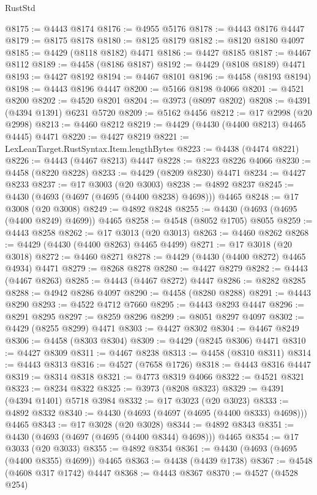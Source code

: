 \begin{lexlean}{RustStd}
\begin{coremodule}
@8175 := @4443 @8174
@8176 := @4955 @5176
@8178 := @4443 @8176 @4447
@8179 := @8175 @8178
@8180 := @8125 @8179
@8182 := @8120 @8180 @4097
@8185 := @4429 (@8118 @8182) @4471
@8186 := @4427 @8185
@8187 := @4467 @8112
@8189 := @4458 (@8186 @8187)
@8192 := @4429 (@8108 @8189) @4471
@8193 := @4427 @8192
@8194 := @4467 @8101
@8196 := @4458 (@8193 @8194)
@8198 := @4443 @8196 @4447
@8200 := @5166 @8198 @4066
@8201 := @4521 @8200
@8202 := @4520 @8201
@8204 := @3973 (@8097 @8202)
@8208 := @4391 (@4394 @1391) @6231 @5720
@8209 := @5162 @4456
@8212 := @17 @2998 (@20 @2998)
@8213 := @4460 @8212
@8219 := @4429 (@4430 (@4400 @8213) @4465 @4445) @4471
@8220 := @4427 @8219
@8221 := LexLeanTarget.RustSyntax.Item.lengthBytes
@8223 := @4438 (@4474 @8221)
@8226 := @4443 (@4467 @8213) @4447
@8228 := @8223 @8226 @4066
@8230 := @4458 (@8220 @8228)
@8233 := @4429 (@8209 @8230) @4471
@8234 := @4427 @8233
@8237 := @17 @3003 (@20 @3003)
@8238 := @4892 @8237
@8245 := @4430 (@4693 (@4697 (@4695 (@4400 @8238) @4698))) @4465
@8248 := @17 @3008 (@20 @3008)
@8249 := @4892 @8248
@8255 := @4430 (@4693 (@4695 (@4400 @8249) @4699)) @4465
@8258 := @4548 (@8052 @1705) @8055
@8259 := @4443 @8258
@8262 := @17 @3013 (@20 @3013)
@8263 := @4460 @8262
@8268 := @4429 (@4430 (@4400 @8263) @4465 @4499)
@8271 := @17 @3018 (@20 @3018)
@8272 := @4460 @8271
@8278 := @4429 (@4430 (@4400 @8272) @4465 @4934) @4471
@8279 := @8268 @8278
@8280 := @4427 @8279
@8282 := @4443 (@4467 @8263)
@8285 := @4443 (@4467 @8272) @4447
@8286 := @8282 @8285
@8288 := @4942 @8286 @4097
@8290 := @4458 (@8280 @8288)
@8291 := @4443 @8290
@8293 := @4522 @4712 @7660
@8295 := @4443 @8293 @4447
@8296 := @8291 @8295
@8297 := @8259 @8296
@8299 := @8051 @8297 @4097
@8302 := @4429 (@8255 @8299) @4471
@8303 := @4427 @8302
@8304 := @4467 @8249
@8306 := @4458 (@8303 @8304)
@8309 := @4429 (@8245 @8306) @4471
@8310 := @4427 @8309
@8311 := @4467 @8238
@8313 := @4458 (@8310 @8311)
@8314 := @4443 @8313
@8316 := @4527 (@7658 @1726)
@8318 := @4443 @8316 @4447
@8319 := @8314 @8318
@8321 := @4773 @8319 @4066
@8322 := @4521 @8321
@8323 := @8234 @8322
@8325 := @3973 (@8208 @8323)
@8329 := @4391 (@4394 @1401) @5718 @3984
@8332 := @17 @3023 (@20 @3023)
@8333 := @4892 @8332
@8340 := @4430 (@4693 (@4697 (@4695 (@4400 @8333) @4698))) @4465
@8343 := @17 @3028 (@20 @3028)
@8344 := @4892 @8343
@8351 := @4430 (@4693 (@4697 (@4695 (@4400 @8344) @4698))) @4465
@8354 := @17 @3033 (@20 @3033)
@8355 := @4892 @8354
@8361 := @4430 (@4693 (@4695 (@4400 @8355) @4699)) @4465
@8363 := @4438 (@4439 @1738)
@8367 := @4548 (@4608 @317 @1742) @4447
@8368 := @4443 @8367
@8370 := @4527 (@4528 @254)

\end{coremodule}
\end{lexlean}
